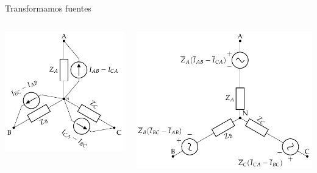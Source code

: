 \documentclass[aspectratio=169, usenames,svgnames,dvipsnames]{beamer}
\begin{document}
\begin{frame}[label={sec:org9f4d19e}]{Transformamos fuentes}
\begin{columns}
\begin{column}{0.5\columnwidth}
\begin{center}
\includegraphics[width=\textwidth]{../figs/GeneradorRealTriangulo_Transformado2.pdf}
\end{center}
\end{column}


\begin{column}{0.5\columnwidth}
\begin{center}
\includegraphics[width=\textwidth]{../figs/GeneradorRealTriangulo_Transformado3.pdf}
\end{center}
\end{column}
\end{columns}
\end{frame}
\end{document}
